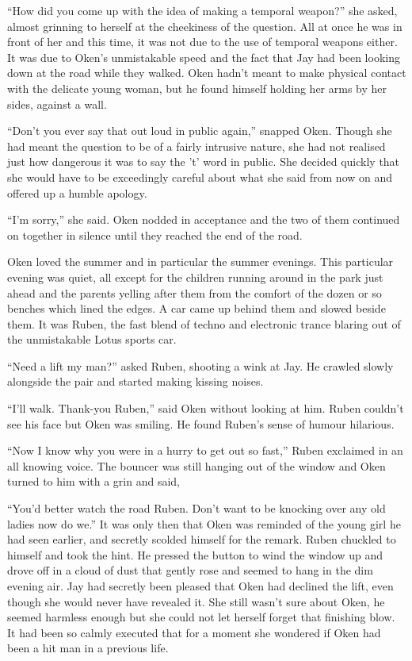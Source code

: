 ``How did you come up with the idea of making a temporal weapon?'' she asked, almost grinning to herself at the cheekiness of the question.  All at once he was in front of her and this time, it was not due to the use of temporal weapons either.  It was due to Oken's unmistakable speed and the fact that Jay had been looking down at the road while they walked.   Oken hadn't meant to make physical contact with the delicate young woman, but he found himself holding her arms by her sides, against a wall.

``Don't you ever say that out loud in public again,'' snapped Oken.  Though she had meant the question to be of a fairly intrusive nature, she had not realised just how dangerous it was to say the 't' word in public.  She decided quickly that she would have to be exceedingly careful about what she said from now on and offered up a humble apology.

``I'm sorry,'' she said.  Oken nodded in acceptance and the two of them continued on together in silence until they reached the end of the road.  

Oken loved the summer and in particular the summer evenings.  This particular evening was quiet, all except for the children running around in the park just ahead and the parents yelling after them from the comfort of the dozen or so benches which lined the edges.  A car came up behind them and slowed beside them.  It was Ruben, the fast blend of techno and electronic trance blaring out of the unmistakable Lotus sports car.

``Need a lift my man?'' asked Ruben, shooting a wink at Jay.  He crawled slowly alongside the pair and started making kissing noises.

``I'll walk. Thank-you Ruben,'' said Oken without looking at him.  Ruben couldn't see his face but Oken was smiling.  He found Ruben's sense of humour hilarious.  

``Now I know why you were in a hurry to get out so fast,'' Ruben exclaimed in an all knowing voice.  The bouncer was still hanging out of the window and Oken turned to him with a grin and said,

``You'd better watch the road Ruben.  Don't want to be knocking over any old ladies now do we.''  It was only then that Oken was reminded of the young girl he had seen earlier, and secretly scolded himself for the remark.  Ruben chuckled to himself and took the hint.  He pressed the button to wind the window up and drove off in a cloud of dust that gently rose and seemed to hang in the dim evening air.  Jay had secretly been pleased that Oken had declined the lift, even though she would never have revealed it.  She still wasn't sure about Oken, he seemed harmless enough but she could not let herself forget that finishing blow.  It had been so calmly executed that for a moment she wondered if Oken had been a hit man in a previous life.    

